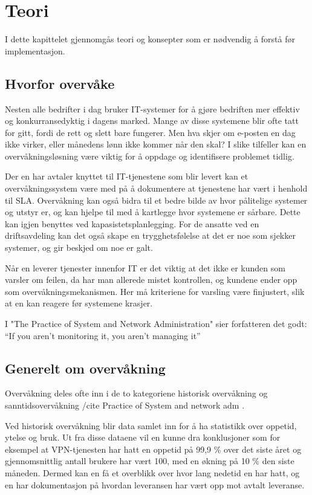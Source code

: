 \chapter{Teori}
I dette kapittelet gjennomgås teori og konsepter som er nødvendig å forstå før implementasjon.
\section{Hvorfor overvåke}
Nesten alle bedrifter i dag bruker IT-systemer for å gjøre bedriften mer effektiv og konkurransedyktig i dagens marked. Mange av disse systemene blir ofte tatt for gitt, fordi de rett og slett bare fungerer. Men hva skjer om e-posten en dag ikke virker, eller månedens lønn ikke kommer når den skal? I slike tilfeller kan en overvåkningsløsning være viktig for å oppdage og identifisere problemet tidlig.

Der en har avtaler knyttet til IT-tjenestene som blir levert kan et overvåkningssystem være med på å dokumentere at tjenestene har vært i henhold til SLA. Overvåkning kan også bidra til et bedre bilde av hvor pålitelige systemer og utstyr er, og kan hjelpe til med å kartlegge hvor systemene er sårbare. Dette kan igjen benyttes ved kapasistetsplanlegging. For de ansatte ved en driftsavdeling kan det også skape en trygghetsfølelse at det er noe som sjekker systemer, og gir beskjed om noe er galt.

Når en leverer tjenester innenfor IT er det viktig at det ikke er kunden som varsler om feilen, da har man allerede mistet kontrollen, og kundene ender opp som overvåkningsmekanismen. Her må kriteriene for varsling være finjustert, slik at en kan reagere før systemene krasjer.

I "The Practice of System and Network Administration" sier forfatteren det godt: ``If you aren’t monitoring it, you aren’t managing it''

\section{Generelt om overvåkning}
Overvåkning deles ofte inn i de to kategoriene historisk overvåkning og sanntidsovervåkning /cite Practice of System and network adm  . 

Ved historisk overvåkning blir data samlet inn for å ha statistikk over oppetid, ytelse og bruk. Ut fra disse dataene vil en kunne dra konklusjoner som for eksempel at VPN-tjenesten har hatt en oppetid på 99,9 \% over det siste året og gjennomsnittlig antall brukere har vært 100, med en økning på 10 \% den siste måneden. Dermed kan en få et overblikk over hvor lang nedetid en har hatt, og en har dokumentasjon på hvordan leveransen har vært opp mot avtalt leveranse.

